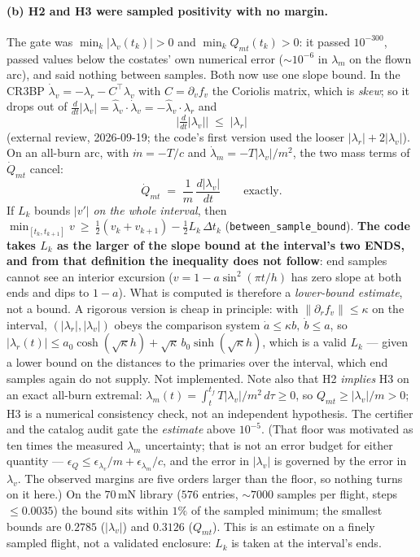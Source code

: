 \documentclass[11pt]{article}
\theoremstyle{definition}
\newcommand{\lv}{\lambda_v}
\newcommand{\lr}{\lambda_r}
\newcommand{\lm}{\lambda_m}
\newcommand{\tf}{t_f}
\begin{document}
\paragraph{(b) H2 and H3 were sampled positivity with no margin.}
The gate was $\min_k|\lv(t_k)|>0$ and $\min_k Q_{mt}(t_k)>0$: it passed
$10^{-300}$, passed values below the costates' own numerical error
($\sim10^{-6}$ in $\lm$ on the flown arc), and said nothing between samples.
Both now use one slope bound. In the CR3BP
$\dot\lambda_v=-\lr-C^{\!\top}\lv$ with $C=\partial_v f_v$ the Coriolis matrix,
which is \emph{skew}; so it drops out of
$\tfrac{d}{dt}|\lv|=\hat\lambda_v\!\cdot\!\dot\lambda_v=-\hat\lambda_v\!\cdot\!\lr$
and
\[
  \Big|\tfrac{d}{dt}|\lv|\Big|\;\le\;|\lr|
\]
(external review, 2026-09-19; the code's first version used the looser
$|\lr|+2|\lv|$). On an all-burn arc, with
$\dot m=-T/c$ and $\dot\lambda_m=-T|\lv|/m^{2}$, the two mass terms of
$\dot Q_{mt}$ cancel:
\[
 \dot Q_{mt}\;=\;\frac{1}{m}\,\frac{d|\lv|}{dt}\qquad\text{exactly.}
\]
If $L_k$ bounds $|v'|$ \emph{on the whole interval}, then
$\min_{[t_k,t_{k+1}]}v\ \ge\ \tfrac12(v_k+v_{k+1})-\tfrac12L_k\,\Delta t_k$
(\texttt{between\_sample\_bound}). \textbf{The code takes $L_k$ as the larger of
the slope bound at the interval's two ENDS, and from that definition the
inequality does not follow}: end samples cannot see an interior excursion
($v=1-a\sin^2(\pi t/h)$ has zero slope at both ends and dips to $1-a$). What is
computed is therefore a \emph{lower-bound estimate}, not a bound. A rigorous
version is cheap in principle: with $\|\partial_rf_v\|\le\kappa$ on the
interval, $(|\lr|,|\lv|)$ obeys the comparison system
$\dot a\le\kappa b,\ \dot b\le a$, so
$|\lr(t)|\le a_0\cosh(\sqrt\kappa h)+\sqrt\kappa\,b_0\sinh(\sqrt\kappa h)$, which
is a valid $L_k$ --- given a lower bound on the distances to the primaries over
the interval, which end samples again do not supply. Not implemented.
Note also that H2 \emph{implies} H3 on an exact all-burn extremal:
$\lm(t)=\int_t^{\tf}T|\lv|/m^2\,d\tau\ge0$, so $Q_{mt}\ge|\lv|/m>0$; H3 is a
numerical consistency check, not an independent hypothesis. The certifier and the catalog audit gate the
\emph{estimate} above $10^{-5}$. (That floor was motivated as ten times the
measured $\lm$ uncertainty; that is not an error budget for either quantity ---
$\epsilon_Q\le\epsilon_{\lambda_v}/m+\epsilon_{\lm}/c$, and the error in
$|\lv|$ is governed by the error in $\lv$. The observed margins are five orders
larger than the floor, so nothing turns on it here.) On the
$70$\,mN library ($576$ entries, $\sim7000$ samples per flight, steps
$\le0.0035$) the bound sits within $1\%$ of the sampled minimum; the smallest
bounds are $0.2785$ ($|\lv|$) and $0.3126$ ($Q_{mt}$). This is an estimate on a
finely sampled flight, not a validated enclosure: $L_k$ is taken at the
interval's ends.
\end{document}
